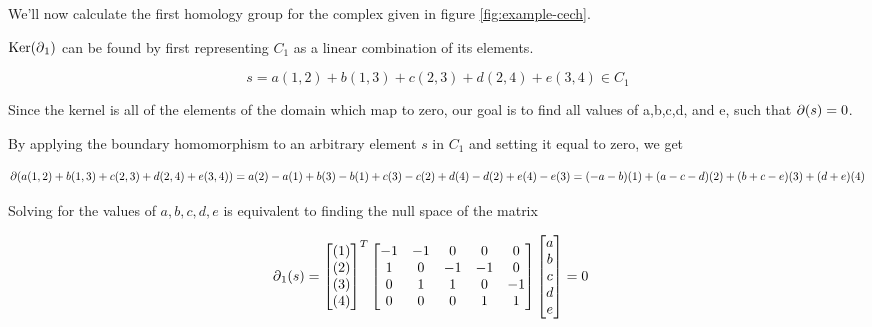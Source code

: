 \begin{example}
    We'll now calculate the first homology group for the complex given in figure \ref{fig:example-cech}.

    \(\operatorname{Ker}(\operatorname{\partial}_1)\) can be found by first representing \(C_1\) as a linear combination of its elements.

    \[s = a(1,2) + b(1,3) + c(2,3) + d(2,4) + e(3,4) \in C_1\]

    Since the kernel is all of the elements of the domain which map to zero, our goal is to find all values of a,b,c,d, and e, such that \(\operatorname{\partial}(s) = 0\).

    By applying the boundary homomorphism to an arbitrary element \(s\) in \(C_1\) and setting it equal to zero, we get

    \[\operatorname{\partial}(a(1,2) + b(1,3) + c(2,3) + d(2,4) + e(3,4)) = a(2) - a(1) + b(3) - b(1) + c(3) - c(2) + d(4) - d(2) + e(4) - e(3) = (-a - b)(1) + (a - c - d)(2) + (b + c - e)(3) + (d + e)(4)\]

    Solving for the values of \(a,b,c,d,e\) is equivalent to finding the null space of the matrix

    \begin{align*}
        \operatorname{\partial}_1(s) &=
            \begin{bmatrix}
                (1)\\(2)\\(3)\\(4)\\
            \end{bmatrix}^T
            \begin{bmatrix}
                -1 & -1 &  0 &  0 &  0 \\
                 1 &  0 & -1 & -1 &  0 \\
                 0 &  1 &  1 &  0 & -1 \\
                 0 &  0 &  0 &  1 &  1 \\
            \end{bmatrix}
            \begin{bmatrix}
                a\\b\\c\\d\\e\\
            \end{bmatrix}
            = 0
    \end{align*}

\end{example}

